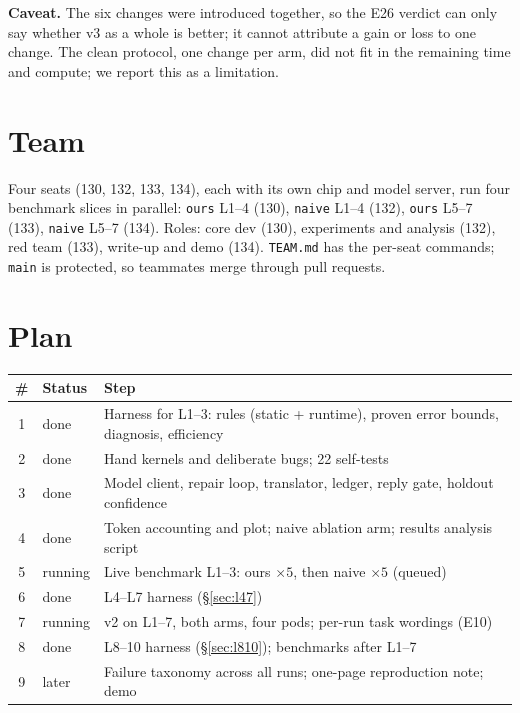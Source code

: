 \documentclass[11pt]{article}
\newcommand{\code}[1]{\texttt{#1}}
\begin{document}
\textbf{Caveat.} The six changes were introduced together, so the E26 verdict can only say whether v3 as
a whole is better; it cannot attribute a gain or loss to one change. The clean protocol, one change per
arm, did not fit in the remaining time and compute; we report this as a limitation.

\section{Team}
Four seats (130, 132, 133, 134), each with its own chip and model server, run four benchmark slices
in parallel: \code{ours} L1--4 (130), \code{naive} L1--4 (132), \code{ours} L5--7 (133),
\code{naive} L5--7 (134). Roles: core dev (130), experiments and analysis (132), red team (133),
write-up and demo (134). \code{TEAM.md} has the per-seat commands; \code{main} is protected, so
teammates merge through pull requests.

\section{Plan}
\label{sec:plan}

\begin{tabularx}{\linewidth}{@{}clY@{}}
\toprule
\# & Status & Step \\
 & done & Harness for L1--3: rules (static + runtime), proven error bounds, diagnosis, efficiency \\
2 & done & Hand kernels and deliberate bugs; 22 self-tests \\
3 & done & Model client, repair loop, translator, ledger, reply gate, holdout confidence \\
4 & done & Token accounting and plot; naive ablation arm; results analysis script \\
5 & running & Live benchmark L1--3: ours $\times5$, then naive $\times5$ (queued) \\
6 & done & L4--L7 harness (\S\ref{sec:l47}) \\
7 & running & v2 on L1--7, both arms, four pods; per-run task wordings (E10) \\
8 & done & L8--10 harness (\S\ref{sec:l810}); benchmarks after L1--7 \\
9 & later & Failure taxonomy across all runs; one-page reproduction note; demo \\
\bottomrule
\end{tabularx}
\end{document}
